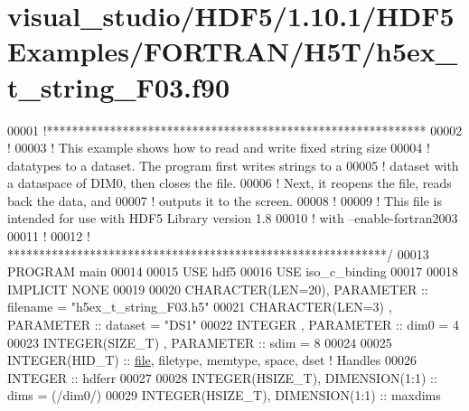 \hypertarget{visual__studio_2_h_d_f5_21_810_81_2_h_d_f5_examples_2_f_o_r_t_r_a_n_2_h5_t_2h5ex__t__string___f03_8f90_source}{}\section{visual\+\_\+studio/\+H\+D\+F5/1.10.1/\+H\+D\+F5\+Examples/\+F\+O\+R\+T\+R\+A\+N/\+H5\+T/h5ex\+\_\+t\+\_\+string\+\_\+\+F03.f90}
\label{visual__studio_2_h_d_f5_21_810_81_2_h_d_f5_examples_2_f_o_r_t_r_a_n_2_h5_t_2h5ex__t__string___f03_8f90_source}

\begin{DoxyCode}
00001 \textcolor{comment}{!************************************************************}
00002 \textcolor{comment}{!}
00003 \textcolor{comment}{!  This example shows how to read and write fixed string size}
00004 \textcolor{comment}{!  datatypes to a dataset.  The program first writes strings to a}
00005 \textcolor{comment}{!  dataset with a dataspace of DIM0, then closes the file.}
00006 \textcolor{comment}{!  Next, it reopens the file, reads back the data, and}
00007 \textcolor{comment}{!  outputs it to the screen.}
00008 \textcolor{comment}{!}
00009 \textcolor{comment}{!  This file is intended for use with HDF5 Library version 1.8}
00010 \textcolor{comment}{!  with --enable-fortran2003 }
00011 \textcolor{comment}{!}
00012 \textcolor{comment}{! ************************************************************/}
00013 \textcolor{keyword}{PROGRAM} main
00014 
00015   \textcolor{keywordtype}{USE }hdf5
00016   \textcolor{keywordtype}{USE }iso\_c\_binding
00017 
00018   \textcolor{keywordtype}{IMPLICIT NONE}
00019 
00020   \textcolor{keywordtype}{CHARACTER(LEN=20)}, \textcolor{keywordtype}{PARAMETER} :: filename  = \textcolor{stringliteral}{"h5ex\_t\_string\_F03.h5"}
00021   \textcolor{keywordtype}{CHARACTER(LEN=3)} , \textcolor{keywordtype}{PARAMETER} :: dataset   = \textcolor{stringliteral}{"DS1"}
00022   \textcolor{keywordtype}{INTEGER}          , \textcolor{keywordtype}{PARAMETER} :: dim0      = 4
00023   \textcolor{keywordtype}{INTEGER(SIZE\_T)}  , \textcolor{keywordtype}{PARAMETER} :: sdim      = 8 
00024 
00025   \textcolor{keywordtype}{INTEGER(HID\_T)}  :: \hyperlink{structfile}{file}, filetype, memtype, space, dset \textcolor{comment}{! Handles}
00026   \textcolor{keywordtype}{INTEGER} :: hdferr
00027 
00028   \textcolor{keywordtype}{INTEGER(HSIZE\_T)}, \textcolor{keywordtype}{DIMENSION(1:1)} :: dims = (/dim0/)
00029   \textcolor{keywordtype}{INTEGER(HSIZE\_T)}, \textcolor{keywordtype}{DIMENSION(1:1)} :: maxdims

\end{DoxyCode}
